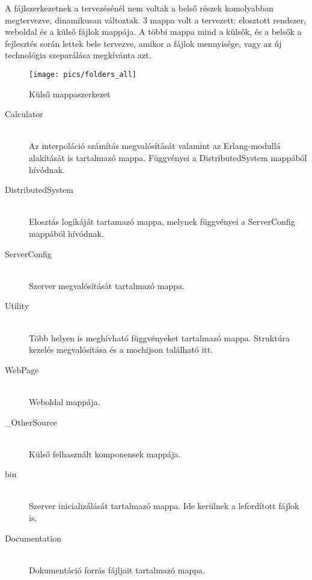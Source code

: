 
A fájlszerkezetnek a tervezésénél nem voltak a belső részek komolyabban megtervezve, dinamikusan változtak. 3 mappa volt a tervezett: elosztott rendszer, weboldal és a külső fájlok mappája. A többi mappa mind a külsők, és a belsők a fejlesztés során lettek bele tervezve, amikor a fájlok mennyisége, vagy az új technológia szeparálása megkívánta azt.

\begin{figure}[h]
	\texttt{[image: pics/folders\_all]}
	\centering
	\caption{Külső mappaszerkezet\label{fig:folders_all}}
\end{figure}

\begin{description}
	\item[Calculator] \hfill \\ 
		Az interpoláció számítás megvalósítását valamint az Erlang-modullá alakítását is tartalmazó mappa.
		Függvényei a DistributedSystem mappából hívódnak.
	\item[DistributedSystem] \hfill \\ 
		Elosztás logikáját tartamazó mappa, melynek függvényei a ServerConfig mappából hívódnak. 
	\item[ServerConfig] \hfill \\ 
		Szerver megvalósítását tartalmazó mappa.
	\item[Utility] \hfill \\ 
		Több helyen is meghívható függvényeket tartalmazó mappa.
		Struktúra kezelés megvalósítása és a mochijson található itt. 
	\item[WebPage] \hfill \\ 
		Weboldal mappája. 
	\item[\_OtherSource] \hfill \\ 
		Külső felhasznált komponensek mappája.
	\item[bin] \hfill \\ 
		Szerver inicializálását tartalmazó mappa. Ide kerülnek a lefordított fájlok is.
	\item[Documentation] \hfill \\
		Dokumentáció forrás fájljait tartalmazó mappa. 
\end{description}